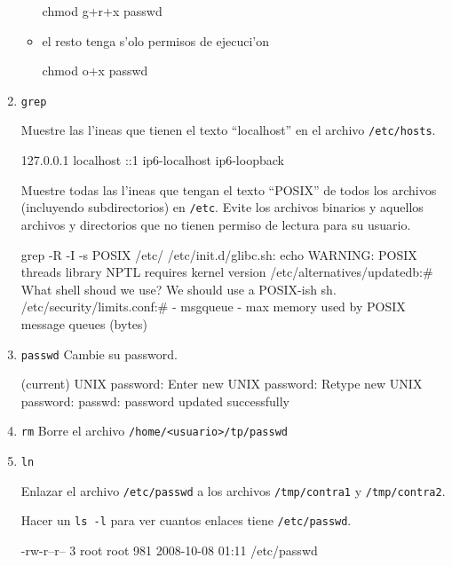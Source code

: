 \begin{enumerate}
\begin{itemize}
\begin{lastTwo}
chmod g+r+x passwd
\end{lastTwo}

\item el resto tenga s'olo permisos de ejecuci'on

\begin{lastTwo}
chmod o+x passwd
\end{lastTwo}
\end{itemize}

\item \texttt{grep}

Muestre las l'ineas que tienen el texto ``localhost'' en el archivo \texttt{/etc/hosts}.

\begin{lastTwo}
127.0.0.1	localhost
::1     ip6-localhost ip6-loopback
\end{lastTwo}

Muestre todas las l'ineas que tengan el texto ``POSIX'' de todos los archivos (incluyendo subdirectorios) en \texttt{/etc}.
Evite los archivos binarios y aquellos archivos y directorios que no tienen permiso de lectura para su usuario.

\begin{lastTwo}
grep -R -I -s POSIX /etc/
/etc/init.d/glibc.sh:     echo WARNING: POSIX threads library NPTL requires kernel version
/etc/alternatives/updatedb:\# What shell shoud we use?  We should use a POSIX-ish sh.
/etc/security/limits.conf:\# - msgqueue - max memory used by POSIX message queues (bytes)
\end{lastTwo}

\item \texttt{passwd} Cambie su password.

\begin{lastTwo}
(current) UNIX password:
Enter new UNIX password:
Retype new UNIX password:
passwd: password updated successfully
\end{lastTwo}

\item \texttt{rm} Borre el archivo \texttt{/home/<usuario>/tp/passwd}

\item \texttt{ln}

Enlazar el archivo \texttt{/etc/passwd} a los archivos \texttt{/tmp/contra1} y \texttt{/tmp/contra2}.

Hacer un \texttt{ls -l} para ver cuantos enlaces tiene \texttt{/etc/passwd}.

\begin{lastTwo}
-rw-r--r-- 3 root root 981 2008-10-08 01:11 /etc/passwd
\end{lastTwo}


\end{enumerate}
